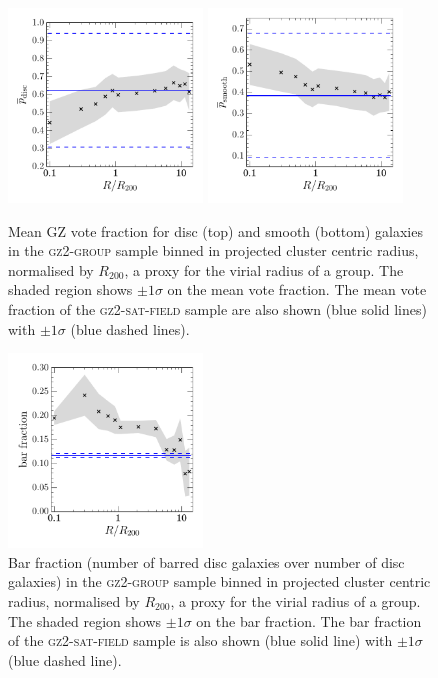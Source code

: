 \documentclass[useAMS,usenatbib]{mn2e}
\begin{document}
\begin{figure}
\includegraphics[width=0.46\textwidth]{p_disc_trend_with_log_radius_field_compare.pdf}
\includegraphics[width=0.46\textwidth]{p_smooth_trend_with_log_radius_field_compare.pdf}
\caption{Mean GZ vote fraction for disc (top) and smooth (bottom) galaxies in the \textsc{gz2-group} sample binned in projected cluster centric radius, normalised by $R_{200}$, a proxy for the virial radius of a group. The shaded region shows $\pm1\sigma$ on the mean vote fraction. The mean vote fraction of the \textsc{gz2-sat-field} sample are also shown (blue solid lines) with $\pm1\sigma$ (blue dashed lines).}
\label{fig:morphradius}
\end{figure}

\begin{figure}
\includegraphics[width=0.46\textwidth]{bar_fraction_over_disc_trend_with_log_radius_sat_matched_field_cand.pdf}
\caption{Bar fraction (number of barred disc galaxies over number of disc galaxies) in the \textsc{gz2-group} sample binned in projected cluster centric radius, normalised by $R_{200}$, a proxy for the virial radius of a group. The shaded region shows $\pm1\sigma$ on the bar fraction. The bar fraction of the \textsc{gz2-sat-field} sample is also shown (blue solid line) with $\pm1\sigma$ (blue dashed line).}
\label{fig:barradius}
\end{figure}
\end{document}
